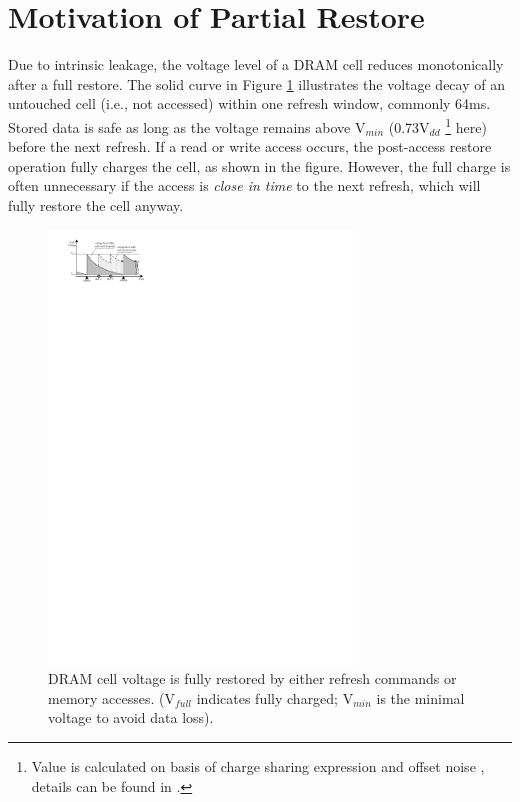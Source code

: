 \section{Motivation of Partial Restore}
Due to intrinsic leakage, the voltage level of a DRAM cell reduces monotonically after a full restore. The solid curve in Figure \ref{fig:partial} illustrates the voltage decay of an untouched cell (i.e., not accessed) within one refresh window, commonly 64ms. Stored data is safe as long as the voltage remains above V$_{min}$ (0.73V$_{dd}$
\footnote{Value is calculated on basis of charge sharing expression \cite{BOOK13:sharing} and offset noise \cite{JSSC02:sense}, details can be found in \cite{HPCA16:twr}.}
 here)  before the next refresh. If a read or write access occurs, the post-access restore operation fully charges the cell, as shown in the figure. However, the full charge is often unnecessary if the access is {\em close in time} to the next refresh, which will fully restore the cell anyway.

\begin{figure}[htbp]
\begin{center}
\centering
\includegraphics[width=3.2in]{figures/HPCA16/rt_partial.pdf}
\vspace{-0.2in}
\caption{DRAM cell voltage is fully restored by either refresh commands or memory accesses.  (V$_{full}$ indicates fully charged; V$_{min}$ is the minimal voltage to avoid data loss).}
\label{fig:partial}
\vspace{-0.3in}
\end{center}
\end{figure}

